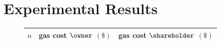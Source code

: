 \section{Experimental Results}\label{sect:evaluation}

\begin{figure}[t]
	\centering
	\begin{tabular}[b]{| c | c | c | }	
		\hline
		$n$ &	gas cost $\owner$ $(\$)$ & gas cost $\shareholder$ $(\$)$ 
		\\	\hline \hline

\end{tabular}
\end{figure}
